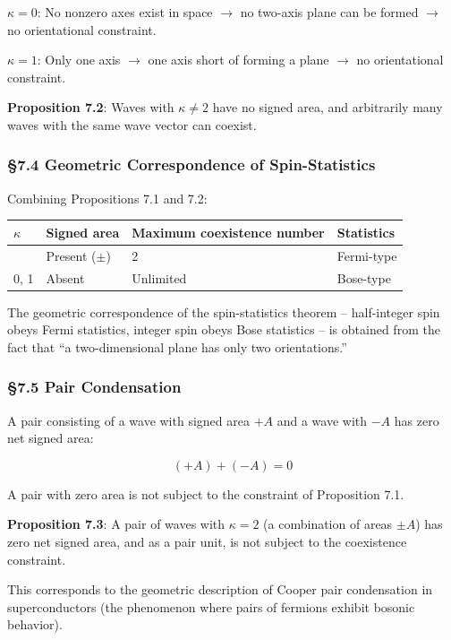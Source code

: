 \documentclass[
  a4paper,11pt]{article}
\newcounter{none}
\theoremstyle{definition}
\theoremstyle{remark}
\begin{document}
\(\kappa = 0\): No nonzero axes exist in space \(\to\) no two-axis plane
can be formed \(\to\) no orientational constraint.

\(\kappa = 1\): Only one axis \(\to\) one axis short of forming a plane
\(\to\) no orientational constraint.

\textbf{Proposition 7.2}: Waves with \(\kappa \neq 2\) have no signed
area, and arbitrarily many waves with the same wave vector can coexist.

\subsubsection{§7.4 Geometric Correspondence of
Spin-Statistics}\label{geometric-correspondence-of-spin-statistics}

Combining Propositions 7.1 and 7.2:

{\def\LTcaptype{none} %
\begin{longtable}[]{@{}llll@{}}
\toprule\noalign{}
\(\kappa\) & Signed area & Maximum coexistence number & Statistics \\
\midrule\noalign{}
\endhead
\bottomrule\noalign{}
\endlastfoot
2 & Present (\(\pm\)) & 2 & Fermi-type \\
0, 1 & Absent & Unlimited & Bose-type \\
\end{longtable}
}

The geometric correspondence of the spin-statistics theorem --
half-integer spin obeys Fermi statistics, integer spin obeys Bose
statistics -- is obtained from the fact that ``a two-dimensional plane
has only two orientations.''

\subsubsection{§7.5 Pair Condensation}\label{pair-condensation}

A pair consisting of a wave with signed area \(+A\) and a wave with
\(-A\) has zero net signed area:

\[(+A) + (-A) = 0\]

A pair with zero area is not subject to the constraint of Proposition
7.1.

\textbf{Proposition 7.3}: A pair of waves with \(\kappa = 2\) (a
combination of areas \(\pm A\)) has zero net signed area, and as a pair
unit, is not subject to the coexistence constraint.

This corresponds to the geometric description of Cooper pair
condensation in superconductors (the phenomenon where pairs of fermions
exhibit bosonic behavior).
\end{document}
